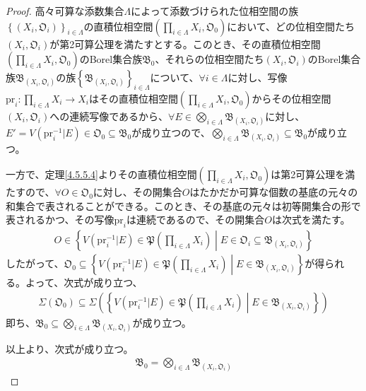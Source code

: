 \documentclass[dvipdfmx]{jsarticle}
\begin{document}
\begin{proof}
高々可算な添数集合$\varLambda$によって添数づけられた位相空間の族$\left\{ \left( X_{i},\mathfrak{O}_{i} \right) \right\}_{i \in \varLambda }$の直積位相空間$\left( \prod_{i \in \varLambda } X_{i},\mathfrak{O}_{0} \right)$において、どの位相空間たち$\left( X_{i},\mathfrak{O}_{i} \right)$が第2可算公理を満たすとする。このとき、その直積位相空間$\left( \prod_{i \in \varLambda } X_{i},\mathfrak{O}_{0} \right)$のBorel集合族$\mathfrak{B}_{0}$、それらの位相空間たち$\left( X_{i},\mathfrak{O}_{i} \right)$のBorel集合族$\mathfrak{B}_{\left( X_{i},\mathfrak{O}_{i} \right)}$の族$\left\{ \mathfrak{B}_{\left( X_{i},\mathfrak{O}_{i} \right)} \right\}_{i \in \varLambda }$について、$\forall i \in \varLambda$に対し、写像$\mathrm{pr}_{i}:\prod_{i \in \varLambda } X_{i} \rightarrow X_{i}$はその直積位相空間$\left( \prod_{i \in \varLambda } X_{i},\mathfrak{O}_{0} \right)$からその位相空間$\left( X_{i},\mathfrak{O}_{i} \right)$への連続写像であるから、$\forall E \in \bigotimes_{i \in \varLambda } \mathfrak{B}_{\left( X_{i},\mathfrak{O}_{i} \right)}$に対し、$E' = V\left( \mathrm{pr}_{i}^{- 1}|E \right) \in \mathfrak{O}_{0} \subseteq \mathfrak{B}_{0}$が成り立つので、$\bigotimes_{i \in \varLambda } \mathfrak{B}_{\left( X_{i},\mathfrak{O}_{i} \right)} \subseteq \mathfrak{B}_{0}$が成り立つ。\par
一方で、定理\ref{4.5.5.4}よりその直積位相空間$\left( \prod_{i \in \varLambda } X_{i},\mathfrak{O}_{0} \right)$は第2可算公理を満たすので、$\forall O \in \mathfrak{O}_{0}$に対し、その開集合$O$はたかだか可算な個数の基底の元々の和集合で表されることができる。このとき、その基底の元々は初等開集合の形で表されるかつ、その写像$\mathrm{pr}_{i}$は連続であるので、その開集合$O$は次式を満たす。
\begin{align*}
O \in \left\{ V\left( \mathrm{pr}_{i}^{- 1}|E \right)\in \mathfrak{P}\left( \prod_{i \in \varLambda} X_{i} \right) \middle| E \in \mathfrak{O}_{i} \subseteq \mathfrak{B}_{\left( X_{i},\mathfrak{O}_{i} \right)} \right\}
\end{align*}
したがって、$\mathfrak{O}_{0} \subseteq \left\{ V\left( \mathrm{pr}_{i}^{- 1}|E \right)\in \mathfrak{P}\left( \prod_{i \in \varLambda} X_{i} \right) \middle| E \in \mathfrak{B}_{\left( X_{i},\mathfrak{O}_{i} \right)} \right\}$が得られる。よって、次式が成り立つ、
\begin{align*}
\varSigma\left( \mathfrak{O}_{0} \right) \subseteq \varSigma\left( \left\{ V\left( \mathrm{pr}_{i}^{- 1}|E \right)\in \mathfrak{P}\left( \prod_{i \in \varLambda} X_{i} \right) \middle| E \in \mathfrak{B}_{\left( X_{i},\mathfrak{O}_{i} \right)} \right\} \right)
\end{align*}
即ち、$\mathfrak{B}_{0} \subseteq \bigotimes_{i \in \varLambda } \mathfrak{B}_{\left( X_{i},\mathfrak{O}_{i} \right)}$が成り立つ。\par
以上より、次式が成り立つ。
\begin{align*}
\mathfrak{B}_{0} = \bigotimes_{i \in \varLambda } \mathfrak{B}_{\left( X_{i},\mathfrak{O}_{i} \right)}
\end{align*}
\end{proof}
\end{document}
